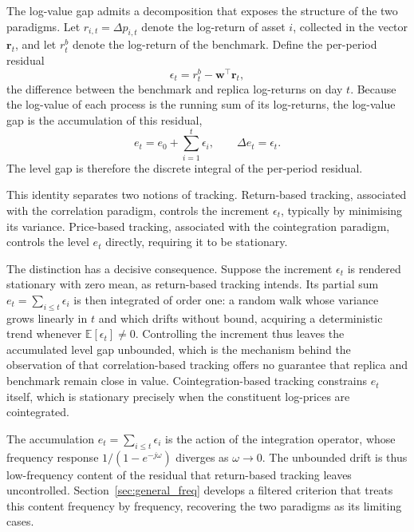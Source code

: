 \documentclass[12pt,a4paper]{article}
\begin{document}
The log-value gap admits a decomposition that exposes the structure of the
two paradigms. Let $r_{i,t}=\Delta p_{i,t}$ denote the log-return of asset
$i$, collected in the vector $\mathbf{r}_t$, and let $r_t^b$ denote the
log-return of the benchmark. Define the per-period residual
\begin{equation}
    \epsilon_t = r_t^b - \mathbf{w}^\top \mathbf{r}_t,
\end{equation}
the difference between the benchmark and replica log-returns on day $t$.
Because the log-value of each process is the running sum of its
log-returns, the log-value gap is the accumulation of this residual,
\begin{equation}
    e_t = e_0 + \sum_{i=1}^{t}\epsilon_i, \qquad \Delta e_t = \epsilon_t.
\end{equation}
The level gap is therefore the discrete integral of the per-period
residual.

This identity separates two notions of tracking. Return-based tracking,
associated with the correlation paradigm, controls the increment
$\epsilon_t$, typically by minimising its variance. Price-based tracking,
associated with the cointegration paradigm, controls the level $e_t$
directly, requiring it to be stationary.

The distinction has a decisive consequence. Suppose the increment
$\epsilon_t$ is rendered stationary with zero mean, as return-based
tracking intends. Its partial sum $e_t=\sum_{i\le t}\epsilon_i$ is then
integrated of order one: a random walk whose variance grows linearly in
$t$ and which drifts without bound, acquiring a deterministic trend
whenever $\mathbb{E}[\epsilon_t]\neq 0$. Controlling the increment thus
leaves the accumulated level gap unbounded, which is the mechanism behind
the observation of \citet{Alexander1999} that correlation-based tracking
offers no guarantee that replica and benchmark remain close in value.
Cointegration-based tracking constrains $e_t$ itself, which is stationary
precisely when the constituent log-prices are cointegrated.

The accumulation $e_t=\sum_{i\le t}\epsilon_i$ is the action of the
integration operator, whose frequency response $1/(1-e^{-j\omega})$
diverges as $\omega\to 0$. The unbounded drift is thus low-frequency
content of the residual that return-based tracking leaves uncontrolled.
Section~\ref{sec:general_freq} develops a filtered criterion that treats
this content frequency by frequency, recovering the two paradigms as its
limiting cases.
\end{document}
